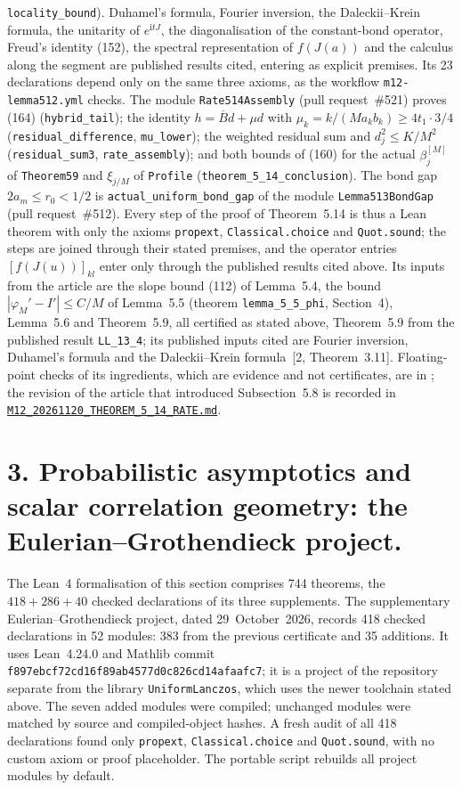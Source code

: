 \documentclass[11pt,a4paper]{article}
\newcommand{\R}{https://github.com/ralfanop/Certifications_Eulerian_polar-curve_computations}
\newcommand{\dir}[1]{\href{\R/tree/main/#1}{\texttt{\detokenize{#1}}}}
\newcommand{\eq}[1]{(#1)}
\begin{document}
\texttt{locality\_bound}). Duhamel's formula, Fourier inversion, the Daleckii--Krein formula, the unitarity of $e^{\mathrm{i}tJ}$, the diagonalisation of the constant-bond operator, Freud's identity \eq{152}, the spectral representation of $f(J(a))$ and the calculus along the segment are published results cited, entering as explicit premises. Its 23 declarations depend only on the same three axioms, as the workflow \texttt{m12-lemma512.yml} checks. The module \texttt{Rate514Assembly} (pull request~\#521) proves \eq{164} (\texttt{hybrid\_tail}); the identity $h=\overline Bd+\mu d$ with $\mu_k=k/(Ma_kb_k)\geq4t_1\cdot3/4$ (\texttt{residual\_difference}, \texttt{mu\_lower}); the weighted residual sum and $d_j^2\leq K/M^2$ (\texttt{residual\_sum3}, \texttt{rate\_assembly}); and both bounds of \eq{160} for the actual $\beta_j^{[M]}$ of \texttt{Theorem59} and $\xi_{j/M}$ of \texttt{Profile} (\texttt{theorem\_5\_14\_conclusion}). The bond gap $2a_m\leq r_0<1/2$ is \texttt{actual\_uniform\_bond\_gap} of the module \texttt{Lemma513BondGap} (pull request~\#512). Every step of the proof of Theorem~5.14 is thus a Lean theorem with only the axioms \texttt{propext}, \texttt{Classical.choice} and \texttt{Quot.sound}; the steps are joined through their stated premises, and the operator entries $[f(J(u))]_{kl}$ enter only through the published results cited above. Its inputs from the article are the slope bound \eq{112} of Lemma~5.4, the bound $|\varphi_M'-I'|\leq C/M$ of Lemma~5.5 (theorem \texttt{lemma\_5\_5\_phi}, Section~4), Lemma~5.6 and Theorem~5.9, all certified as stated above, Theorem~5.9 from the published result \texttt{LL\_13\_4}; its published inputs cited are Fourier inversion, Duhamel's formula and the Daleckii--Krein formula~[2, Theorem~3.11]. Floating-point checks of its ingredients, which are evidence and not certificates, are in \dir{numerics/uniform_lanczos/rate_theorem_5_14}; the revision of the article that introduced Subsection~5.8 is recorded in \href{\R/blob/main/docs/manuscript12/M12_20261120_THEOREM_5_14_RATE.md}{\texttt{M12\_20261120\_THEOREM\_5\_14\_RATE.md}}.

\section*{3. Probabilistic asymptotics and scalar correlation geometry: the Eulerian--Grothendieck project.}
The Lean~4 formalisation of this section comprises 744 theorems, the $418+286+40$ checked declarations of its three supplements. The supplementary Eulerian--Grothendieck project, dated 29~October~2026, records 418 checked declarations in 52 modules: 383 from the previous certificate and 35 additions. It uses Lean~4.24.0 and Mathlib commit \texttt{f897ebcf72cd16f89ab4577d0c826cd14afaafc7}; it is a project of the repository separate from the library \texttt{UniformLanczos}, which uses the newer toolchain stated above. The seven added modules were compiled; unchanged modules were matched by source and compiled-object hashes. A fresh audit of all 418 declarations found only \texttt{propext}, \texttt{Classical.choice} and \texttt{Quot.sound}, with no custom axiom or proof placeholder. The portable script rebuilds all project modules by default.
\end{document}

